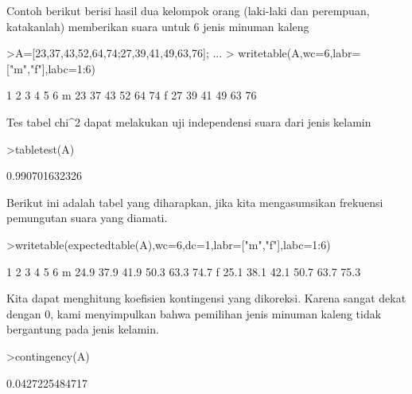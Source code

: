 \documentclass[a4paper,10pt]{article}
\begin{document}
\begin{eulernotebook}
\begin{eulercomment}
\begin{eulercomment}
\begin{eulercomment}
\begin{eulercomment}
\begin{eulercomment}
\begin{eulercomment}
\begin{eulercomment}
\begin{eulercomment}
\begin{eulercomment}
\begin{eulercomment}
\begin{eulercomment}
\begin{eulercomment}
\begin{eulercomment}
\begin{eulercomment}
\begin{eulercomment}
\begin{eulercomment}
\begin{eulercomment}
\begin{eulercomment}
\begin{eulercomment}
\begin{eulercomment}
\begin{eulercomment}
Contoh berikut berisi hasil dua kelompok orang (laki-laki dan
perempuan, katakanlah) memberikan suara untuk 6 jenis minuman kaleng
\end{eulercomment}
\begin{eulerprompt}
>A=[23,37,43,52,64,74;27,39,41,49,63,76];  ...
>  writetable(A,wc=6,labr=["m","f"],labc=1:6)
\end{eulerprompt}
\begin{euleroutput}
             1     2     3     4     5     6
       m    23    37    43    52    64    74
       f    27    39    41    49    63    76
\end{euleroutput}
\begin{eulercomment}
Tes tabel chi\textasciicircum{}2 dapat melakukan uji independensi suara dari jenis
kelamin
\end{eulercomment}
\begin{eulerprompt}
>tabletest(A)
\end{eulerprompt}
\begin{euleroutput}
  0.990701632326
\end{euleroutput}
\begin{eulercomment}
Berikut ini adalah tabel yang diharapkan, jika kita mengasumsikan
frekuensi pemungutan suara yang diamati.
\end{eulercomment}
\begin{eulerprompt}
>writetable(expectedtable(A),wc=6,dc=1,labr=["m","f"],labc=1:6)
\end{eulerprompt}
\begin{euleroutput}
             1     2     3     4     5     6
       m  24.9  37.9  41.9  50.3  63.3  74.7
       f  25.1  38.1  42.1  50.7  63.7  75.3
\end{euleroutput}
\begin{eulercomment}
Kita dapat menghitung koefisien kontingensi yang dikoreksi. Karena
sangat dekat dengan 0, kami menyimpulkan bahwa pemilihan jenis minuman
kaleng tidak bergantung pada jenis kelamin.
\end{eulercomment}
\begin{eulerprompt}
>contingency(A)
\end{eulerprompt}
\begin{euleroutput}
  0.0427225484717
\end{euleroutput}
\begin{eulercomment}
\end{eulercomment}

\end{eulercomment}
\end{eulercomment}
\end{eulercomment}
\end{eulercomment}
\end{eulercomment}
\end{eulercomment}
\end{eulercomment}
\end{eulercomment}
\end{eulercomment}
\end{eulercomment}
\end{eulercomment}
\end{eulercomment}
\end{eulercomment}
\end{eulercomment}
\end{eulercomment}
\end{eulercomment}
\end{eulercomment}
\end{eulercomment}
\end{eulercomment}
\end{eulercomment}
\end{eulernotebook}
\end{document}
